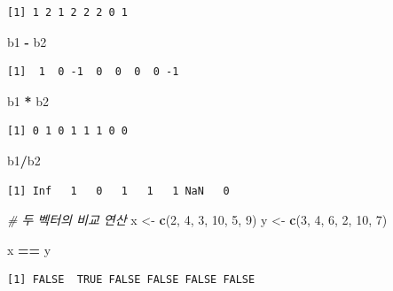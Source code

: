 \documentclass[
  11pt,
]{krantz}
\newenvironment{Shaded}{\begin{snugshade}}{\end{snugshade}}
\newcommand{\CommentTok}[1]{\textcolor[rgb]{0.37,0.37,0.37}{\textit{#1}}}
\newcommand{\DecValTok}[1]{\textcolor[rgb]{0.06,0.06,0.06}{#1}}
\newcommand{\KeywordTok}[1]{\textcolor[rgb]{0.27,0.27,0.27}{\textbf{#1}}}
\newcommand{\NormalTok}[1]{#1}
\newcommand{\OperatorTok}[1]{\textcolor[rgb]{0.43,0.43,0.43}{\textbf{#1}}}
\newcommand{\StringTok}[1]{\textcolor[rgb]{0.5,0.5,0.5}{#1}}
\begin{document}
\begin{verbatim}
[1] 1 2 1 2 2 2 0 1
\end{verbatim}

\begin{Shaded}
\begin{Highlighting}[]
\NormalTok{b1 }\OperatorTok{-}\StringTok{ }\NormalTok{b2}
\end{Highlighting}
\end{Shaded}

\begin{verbatim}
[1]  1  0 -1  0  0  0  0 -1
\end{verbatim}

\begin{Shaded}
\begin{Highlighting}[]
\NormalTok{b1 }\OperatorTok{*}\StringTok{ }\NormalTok{b2}
\end{Highlighting}
\end{Shaded}

\begin{verbatim}
[1] 0 1 0 1 1 1 0 0
\end{verbatim}

\begin{Shaded}
\begin{Highlighting}[]
\NormalTok{b1}\OperatorTok{/}\NormalTok{b2}
\end{Highlighting}
\end{Shaded}

\begin{verbatim}
[1] Inf   1   0   1   1   1 NaN   0
\end{verbatim}

\begin{Shaded}
\begin{Highlighting}[]
\CommentTok{# 두 벡터의 비교 연산}
\NormalTok{x <-}\StringTok{ }\KeywordTok{c}\NormalTok{(}\DecValTok{2}\NormalTok{, }\DecValTok{4}\NormalTok{, }\DecValTok{3}\NormalTok{, }\DecValTok{10}\NormalTok{, }\DecValTok{5}\NormalTok{, }\DecValTok{9}\NormalTok{)}
\NormalTok{y <-}\StringTok{ }\KeywordTok{c}\NormalTok{(}\DecValTok{3}\NormalTok{, }\DecValTok{4}\NormalTok{, }\DecValTok{6}\NormalTok{, }\DecValTok{2}\NormalTok{, }\DecValTok{10}\NormalTok{, }\DecValTok{7}\NormalTok{)}

\NormalTok{x }\OperatorTok{==}\StringTok{ }\NormalTok{y}
\end{Highlighting}
\end{Shaded}

\begin{verbatim}
[1] FALSE  TRUE FALSE FALSE FALSE FALSE
\end{verbatim}
\end{document}
